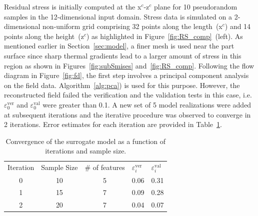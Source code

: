Residual stress is initially computed at the x$^c$-z$^c$ plane for 10 pseudorandom samples in the 12-dimensional
input domain. Stress data is simulated on a 2-dimensional non-uniform grid comprising 32 points along the
length~(x$^c$) and 14 points along the height~(z$^c$) as highlighted in Figure~\ref{fig:RS_comp}~(left).
As mentioned earlier in Section~\ref{sec:model}, a 
finer mesh is used near the part surface since sharp thermal gradients lead to a larger amount of stress
in this region as shown in Figures~\ref{fig:subSmises} and~\ref{fig:RS_comp}.  Following the flow diagram
in Figure~\ref{fig:fd}, the first step involves a principal component analysis on the field data. 
Algorithm~\ref{alg:pca}) is used for this purpose. However, the reconstructed field failed
the verification and the validation tests in this case, i.e. $\varepsilon_0^{\text{ver}}$ and $\varepsilon_0^{\text{val}}$
were greater than 0.1. A new set of 5 model realizations were added at subsequent iterations and the iterative
procedure was observed to converge in 2 iterations. Error estimates for each iteration are provided in
Table~\ref{tab:error}.
%
\begin{table}[htbp]
\centering
\caption{Convergence of the surrogate model as a function of iterations and sample size.}
\label{tab:error}
\vspace{1mm}
\begin{tabular}{ cccll}
\toprule
Iteration &  Sample Size & $\#$ of features & $\varepsilon_i^{\text{ver}}$ & $\varepsilon_i^{\text{val}}$\\
0 & 10 & 5 & 0.06 & 0.31 \\
1 & 15 & 7 & 0.09 & 0.28 \\
2 & 20 & 7 & 0.04 & 0.07\\
\bottomrule
\end{tabular}
\end{table}


